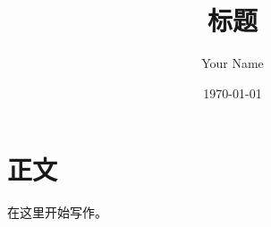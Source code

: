 \documentclass[UTF8,a4paper,12pt,fontset=fandol]{ctexart}
\title{标题}
\author{Your Name}
\date{\today}
\begin{document}
\maketitle

\section{正文}
在这里开始写作。
\end{document}
